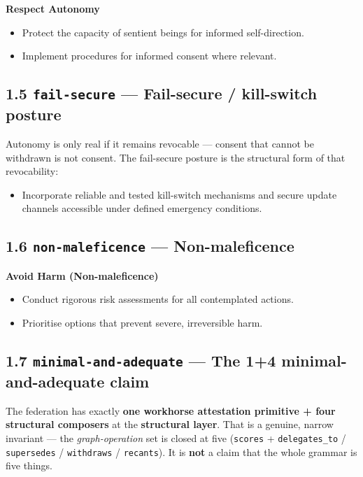 \documentclass[11pt]{article}
\begin{document}
\textbf{Respect Autonomy}

\begin{itemize}\setlength\itemsep{0pt}
\item Protect the capacity of sentient beings for informed self-direction.
\item Implement procedures for informed consent where relevant.
\end{itemize}


\subsection*{1.5 \texttt{fail-secure} — Fail-secure / kill-switch posture}


Autonomy is only real if it remains revocable — consent that cannot be withdrawn is not consent. The fail-secure posture is the structural form of that revocability:


\begin{itemize}\setlength\itemsep{0pt}
\item Incorporate reliable and tested kill-switch mechanisms and secure update channels accessible under defined emergency conditions.
\end{itemize}


\subsection*{1.6 \texttt{non-maleficence} — Non-maleficence}


\textbf{Avoid Harm (Non-maleficence)}

\begin{itemize}\setlength\itemsep{0pt}
\item Conduct rigorous risk assessments for all contemplated actions.
\item Prioritise options that prevent severe, irreversible harm.
\end{itemize}


\subsection*{1.7 \texttt{minimal-and-adequate} — The 1+4 minimal-and-adequate claim}


The federation has exactly \textbf{one workhorse attestation primitive + four structural composers} at the \textbf{structural layer}. That is a genuine, narrow invariant — the \textit{graph-operation} set is closed at five (\texttt{scores} + \texttt{delegates\_to} / \texttt{supersedes} / \texttt{withdraws} / \texttt{recants}). It is \textbf{not} a claim that the whole grammar is five things.
\end{document}
